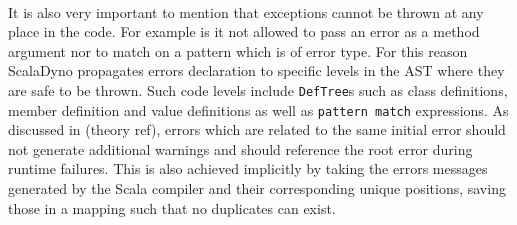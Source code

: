 \\
It is also very important to mention that exceptions cannot be thrown at any place in the code. For example is it not allowed to pass an error as a method argument nor to match on a pattern which is of error type. For this reason ScalaDyno propagates errors declaration to specific levels in the AST where they are safe to be thrown. Such code levels include \texttt{DefTree}s such as class definitions, member definition and value definitions as well as \texttt{pattern match} expressions. As discussed in (theory ref), errors which are related to the same initial error should not generate additional warnings and should reference the root error during runtime failures. This is also achieved implicitly by taking the errors messages generated by the Scala compiler and their corresponding unique positions, saving those in a mapping such that no duplicates can exist.
